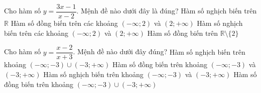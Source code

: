 \begin{ex}
	Cho hàm số $y=\dfrac{3x-1}{x-2}$. Mệnh đề nào dưới đây là đúng?
	\choice
	{Hàm số nghịch biến trên $\mathbb{R}$}
	{Hàm số đồng biến trên các khoảng $(-\infty;2)$ và $(2;+\infty)$}
	{\True Hàm số nghịch biến trên các khoảng $(-\infty;2)$ và $(2;+\infty)$}
	{Hàm số đồng biến trên $\mathbb{R}\setminus\{2\}$}
	
\end{ex} 

\begin{ex}
	Cho hàm số $y=\dfrac{x-2}{x+3}$. Mệnh đề nào dưới đây đúng?
	\choice
	{Hàm số nghịch biến trên khoảng $(-\infty;-3)\cup (-3;+\infty) $}
	{\True Hàm số đồng biến trên khoảng $(-\infty;-3) $ và $(-3;+\infty)$}
	{Hàm số nghịch biến trên khoảng $(-\infty;-3)$ và $(-3;+\infty)$}
	{Hàm số đồng biến trên khoảng $(-\infty;-3)\cup (-3;+\infty) $}
\end{ex} 

